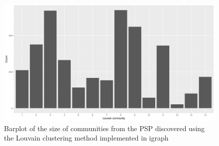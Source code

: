\begin{figure}
    \centering
    \includegraphics[width=\textwidth]{images/Rplot_Louvain_community_sizes.png}
    \caption{Barplot of the size of communities from the PSP discovered using the Louvain clustering method implemented in igraph}
    \label{fig:barplot_size_commmunities_using_louvain}
\end{figure}






